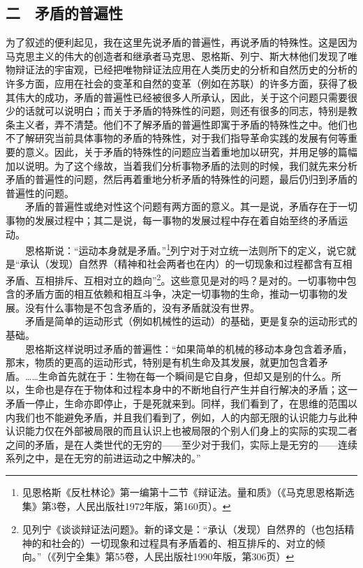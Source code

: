 \documentclass[cn,11pt,chinese]{elegantbook}
\def\myformat#1{\hfil\hfil #1}
\begin{document}
\subsection*{\myformat{二　矛盾的普遍性}}
为了叙述的便利起见，我在这里先说矛盾的普遍性，再说矛盾的特殊性。这是因为马克思主义的伟大的创造者和继承者马克思、恩格斯、列宁、斯大林他们发现了唯物辩证法的宇宙观，已经把唯物辩证法应用在人类历史的分析和自然历史的分析的许多方面，应用在社会的变革和自然的变革（例如在苏联）的许多方面，获得了极其伟大的成功，矛盾的普遍性已经被很多人所承认，因此，关于这个问题只需要很少的话就可以说明白；而关于矛盾的特殊性的问题，则还有很多的同志，特别是教条主义者，弄不清楚。他们不了解矛盾的普遍性即寓于矛盾的特殊性之中。他们也不了解研究当前具体事物的矛盾的特殊性，对于我们指导革命实践的发展有何等重要的意义。因此，关于矛盾的特殊性的问题应当着重地加以研究，并用足够的篇幅加以说明。为了这个缘故，当着我们分析事物矛盾的法则的时候，我们就先来分析矛盾的普遍性的问题，然后再着重地分析矛盾的特殊性的问题，最后仍归到矛盾的普遍性的问题。\\
　　矛盾的普遍性或绝对性这个问题有两方面的意义。其一是说，矛盾存在于一切事物的发展过程中；其二是说，每一事物的发展过程中存在着自始至终的矛盾运动。\\
　　恩格斯说：“运动本身就是矛盾。”\footnote[6]{ 见恩格斯《反杜林论》第一编第十二节《辩证法。量和质》（《马克思恩格斯选集》第3卷，人民出版社1972年版，第160页）。}列宁对于对立统一法则所下的定义，说它就是“承认（发现）自然界（精神和社会两者也在内）的一切现象和过程都含有互相矛盾、互相排斥、互相对立的趋向”\footnote[7]{ 见列宁《谈谈辩证法问题》。新的译文是：“承认（发现）自然界的（也包括精神的和社会的）一切现象和过程具有矛盾着的、相互排斥的、对立的倾向。”（《列宁全集》第55卷，人民出版社1990年版，第306页）}。这些意见是对的吗？是对的。一切事物中包含的矛盾方面的相互依赖和相互斗争，决定一切事物的生命，推动一切事物的发展。没有什么事物是不包含矛盾的，没有矛盾就没有世界。\\
　　矛盾是简单的运动形式（例如机械性的运动）的基础，更是复杂的运动形式的基础。\\
　　恩格斯这样说明过矛盾的普遍性：“如果简单的机械的移动本身包含着矛盾，那末，物质的更高的运动形式，特别是有机生命及其发展，就更加包含着矛盾。……生命首先就在于：生物在每一个瞬间是它自身，但却又是别的什么。所以，生命也是存在于物体和过程本身中的不断地自行产生并自行解决的矛盾；这一矛盾一停止，生命亦即停止，于是死就来到。同样，我们看到了，在思维的范围以内我们也不能避免矛盾，并且我们看到了，例如，人的内部无限的认识能力与此种认识能力仅在外部被局限的而且认识上也被局限的个别人们身上的实际的实现二者之间的矛盾，是在人类世代的无穷的——至少对于我们，实际上是无穷的——连续系列之中，是在无穷的前进运动之中解决的。”\\
\end{document}
